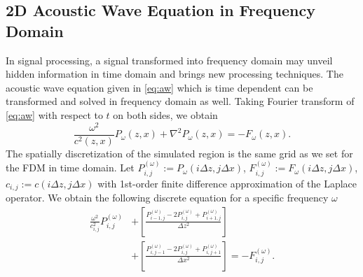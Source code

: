 \documentclass[11pt,titlepage]{article}
\theoremstyle{plain}
\theoremstyle{definition}
\theoremstyle{remark}
\numberwithin{equation}{section}
\begin{document}
\subsection{2D Acoustic Wave Equation in Frequency Domain}
In signal processing, a signal transformed into frequency domain may unveil hidden information in time domain and brings new processing techniques. The acoustic wave equation given in \eqref{eq:aw} which is time dependent can be transformed and solved in frequency domain as well. Taking Fourier transform of \eqref{eq:aw} with respect to $t$ on both sides, we obtain
  \begin{equation}
  \frac{\omega^2}{c^2(z, x)}P_{\omega}(z, x) + \nabla^2 P_{\omega}(z, x) =- F_{\omega}(z, x).
  \end{equation}
 The spatially discretization of the simulated region is the same grid as we set for the FDM in time domain. Let $P_{i,j}^{(\omega)} := P_{\omega}(i\Delta z, j\Delta x)$, $F_{i,j}^{(\omega)} := 
  F_{\omega}(i\Delta z, j\Delta x)$, $c_{i,j} := c(i\Delta z, j\Delta x)$  with 1st-order finite difference approximation of the Laplace operator. We obtain the following discrete equation for a specific frequency $\omega$
  \begin{equation}
  \begin{aligned}
  \frac{\omega^2}{c_{i,j}^2} P_{i,j}^{(\omega)} &+\left[ \frac{P_{i-1,j}^{(\omega)} - 2P_{i,j}^{(\omega)} + P_{i+1,j}^{(\omega)}}{\Delta z^2} \right] \\&+\left[ \frac{P_{i,j-1}^{(\omega)} - 2P_{i,j}^{(\omega)} + P_{i,j+1}^{(\omega)}}{\Delta x^2} \right] =- F_{i,j}^{(\omega)}.
  \end{aligned}
  \end{equation}
  
\end{document}
